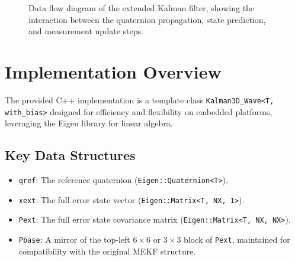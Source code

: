 \documentclass[11pt]{article}
\begin{document}
\begin{figure}[hbt!]
\caption{Data flow diagram of the extended Kalman filter, showing the interaction between the quaternion propagation, state prediction, and measurement update steps.}
\label{fig:dataflow}
\end{figure}

\section{Implementation Overview}
\label{sec:implementation}

The provided C++ implementation is a template class \texttt{Kalman3D\_Wave<T, with\_bias>} designed for efficiency and flexibility on embedded platforms, leveraging the Eigen library for linear algebra.

\subsection{Key Data Structures}
\begin{itemize}
    \item \texttt{qref}: The reference quaternion (\texttt{Eigen::Quaternion<T>}).
    \item \texttt{xext}: The full error state vector (\texttt{Eigen::Matrix<T, NX, 1>}).
    \item \texttt{Pext}: The full error state covariance matrix (\texttt{Eigen::Matrix<T, NX, NX>}).
    \item \texttt{Pbase}: A mirror of the top-left $6\times6$ or $3\times3$ block of \texttt{Pext}, maintained for compatibility with the original MEKF structure.
\end{itemize}
\end{document}
